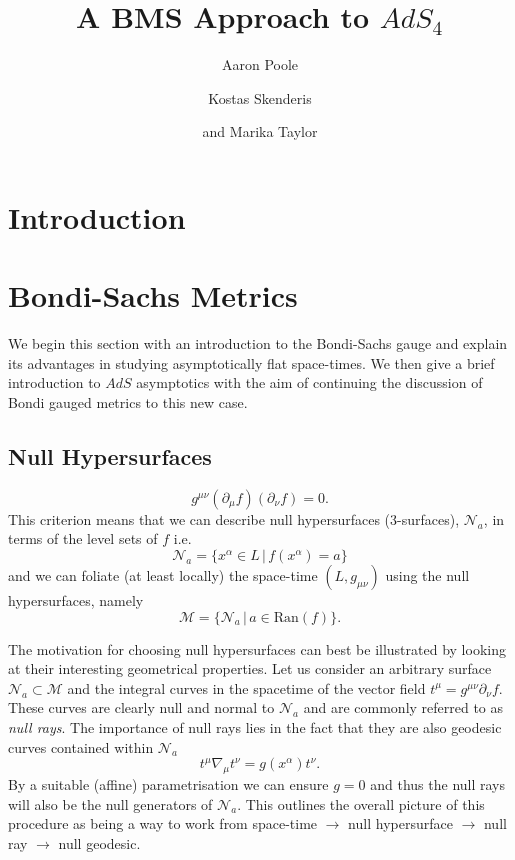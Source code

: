 \documentclass[a4paper,11pt]{article}
\title{A BMS Approach to $AdS_4$}
\author{Aaron Poole}
\author{Kostas Skenderis}
\author{ and Marika Taylor}
\affiliation{Mathematical Sciences and STAG Research Centre, University of Southampton \\
Highfield, Southampton SO17 1BJ, United Kingdom.}
\numberwithin{equation}{section}
\begin{document}
\maketitle
\flushbottom


\section{Introduction}


\section{Bondi-Sachs Metrics} \label{sec: Bondi-Sachs_metrics}


We begin this section with an introduction to the Bondi-Sachs gauge and explain its advantages in studying asymptotically flat space-times. We then give a brief introduction to $AdS$ asymptotics with the aim of continuing the discussion of Bondi gauged metrics to this new case.

\subsection{Null Hypersurfaces}

\begin{equation}
g^{\mu \nu}( \partial_{\mu} f)( \partial_{\nu} f)=0.
\end{equation} 
This criterion means that we can describe null hypersurfaces (3-surfaces), $\mathcal{N}_a$, in terms of the level sets of $f$ i.e. 
\begin{equation}
\mathcal{N}_a=\{x^{\alpha} \in L \, | \, f(x^{\alpha})=a\} 
\end{equation} 
and we can foliate (at least locally) the space-time $(L, g_{\mu \nu})$ using the null hypersurfaces, namely
\begin{equation}
\mathcal{M}=\{\mathcal{N}_a \, | \, a \in \text{Ran}(f)\}.
\end{equation}

The motivation for choosing null hypersurfaces can best be illustrated by looking at their interesting geometrical properties. Let us consider an arbitrary surface $\mathcal{N}_a \subset \mathcal{M}$ and the integral curves in the spacetime of the vector field $t^{\mu}=g^{\mu \nu} \partial_{\nu} f$. These curves are clearly null and normal to $\mathcal{N}_a$ and are commonly referred to as \textit{null rays}. The importance of null rays lies in the fact that they are also geodesic curves contained within $\mathcal{N}_a$ %
\begin{equation}
t^{\mu} \nabla_{\mu} t^{\nu}= g(x^{\alpha}) t^{\nu}.
\end{equation}
By a suitable (affine) parametrisation we can ensure $g=0$ and thus the null rays will also be the null generators of $\mathcal{N}_a$. This outlines the overall picture of this procedure as being a way to work from space-time $\rightarrow$ null hypersurface $\rightarrow$ null ray $\rightarrow$ null geodesic.
\end{document}

